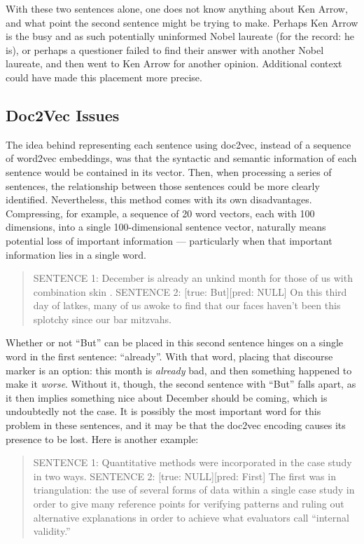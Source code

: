 With these two sentences alone, one does not know anything about Ken Arrow, and what point the second sentence might be trying to make. Perhaps Ken Arrow is the busy and as such potentially uninformed Nobel laureate (for the record: he is), or perhaps a questioner failed to find their answer with another Nobel laureate, and then went to Ken Arrow for another opinion. Additional context could have made this placement more precise.

\subsection{Doc2Vec Issues}

The idea behind representing each sentence using doc2vec, instead of a sequence of word2vec embeddings, was that the syntactic and semantic information of each sentence would be contained in its vector. Then, when processing a series of sentences, the relationship between those sentences could be more clearly identified. Nevertheless, this method comes with its own disadvantages. Compressing, for example, a sequence of 20 word vectors, each with 100 dimensions, into a single 100-dimensional sentence vector, naturally means potential loss of important information --- particularly when that important information lies in a single word.

\begin{quote}
\small{SENTENCE 1:} \quad December is already an unkind month for those of us with combination skin .
\linebreak
\small{SENTENCE 2:} \quad \small{[true: But][pred: NULL]} On this third day of latkes, many of us awoke to find that our faces haven't been this splotchy since our bar mitzvahs.
\end{quote}

Whether or not ``But'' can be placed in this second sentence hinges on a single word in the first sentence: ``already''. With that word, placing that discourse marker is an option: this month is \textit{already} bad, and then something happened to make it \textit{worse}. Without it, though, the second sentence with ``But'' falls apart, as it then implies something nice about December should be coming, which is undoubtedly not the case. It is possibly the most important word for this problem in these sentences, and it may be that the doc2vec encoding causes its presence to be lost. Here is another example:

\begin{quote}
\small{SENTENCE 1:} \quad Quantitative methods were incorporated in the case study in two ways.
\linebreak
\small{SENTENCE 2:} \quad \small{[true: NULL][pred: First]} The first was in triangulation: the use of several forms of data within a single case study in order to give many reference points for verifying patterns and ruling out alternative explanations in order to achieve what evaluators call ``internal validity.''
\end{quote}

